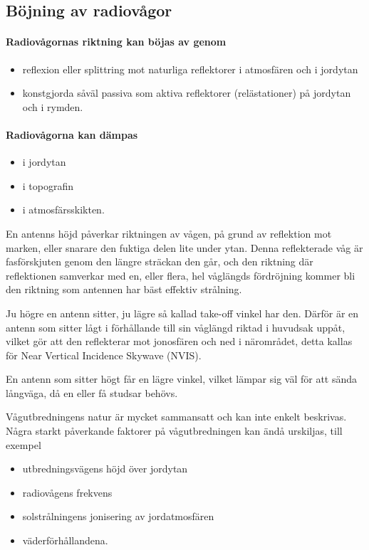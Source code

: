 \newpage %

\subsection{Böjning av radiovågor}

\paragraph{Radiovågornas riktning kan böjas av genom}
\begin{itemize}
  \item reflexion eller splittring mot naturliga reflektorer i
  atmosfären och i jordytan
  \item konstgjorda såväl passiva som aktiva reflektorer (relästationer)
  på jordytan och i rymden.
\end{itemize}

\paragraph{Radiovågorna kan dämpas}
\begin{itemize}
  \item i jordytan
  \item i topografin
  \item i atmosfärsskikten.
\end{itemize}

En antenns höjd påverkar riktningen av vågen, på grund av reflektion mot
marken, eller snarare den fuktiga delen lite under ytan.
Denna reflekterade våg är fasförskjuten genom den längre sträckan den går,
och den riktning där reflektionen samverkar med en, eller flera, hel våglängds
fördröjning kommer bli den riktning som antennen har bäst effektiv strålning.

Ju högre en antenn sitter, ju lägre så kallad take-off vinkel har den.
Därför är en antenn som sitter lågt i förhållande till sin våglängd riktad i
huvudsak uppåt, vilket gör att den reflekterar mot jonosfären och ned i
närområdet, detta kallas för Near Vertical Incidence Skywave (NVIS).

En antenn som sitter högt får en lägre vinkel, vilket lämpar sig väl för att
sända långväga, då en eller få studsar behövs.

Vågutbredningens natur är mycket sammansatt och kan inte enkelt beskrivas.
Några starkt påverkande faktorer på vågutbredningen kan ändå urskiljas, till exempel
\begin{itemize}
  \item utbredningsvägens höjd över jordytan
  \item radiovågens frekvens
  \item solstrålningens jonisering av jordatmosfären
  \item väderförhållandena.
\end{itemize}

